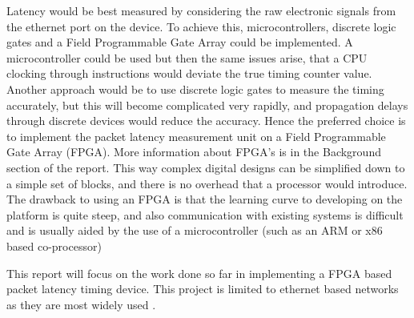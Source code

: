 Latency would be best measured by considering the raw electronic signals from the ethernet port on
the device. To achieve this, microcontrollers, discrete logic gates and a Field Programmable Gate
Array could be implemented. A microcontroller could be used but then the same issues arise, that a
CPU clocking through instructions would deviate the true timing counter value. Another approach
would be to use discrete logic gates to measure the timing accurately, but this will become 
complicated very rapidly, and propagation delays through discrete devices would reduce the 
accuracy. Hence the preferred choice is to implement the packet latency measurement unit on 
a Field Programmable Gate Array (FPGA). More information about FPGA’s is in the Background 
section of the report. This way complex digital designs can be simplified down to a simple 
set of blocks, and there is no overhead that a processor would introduce. The drawback to using an
FPGA is that the learning curve to developing on the platform is quite steep, and also communication with 
existing systems is difficult and is usually aided by the use of a microcontroller (such as an ARM or x86 based co-processor)

\par This report will focus on the work done so far in implementing a FPGA based packet latency timing
device. This project is limited to ethernet based networks as they are most widely used \cite{etherneteverywhere}.
